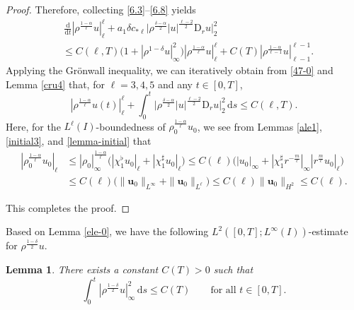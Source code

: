 \documentclass[11pt,reqno]{amsart}
\newtheorem{lem}{Lemma}[section]
\numberwithin{rk}{section}
\numberwithin{prop}{section}
\numberwithin{mydef}{section}
\numberwithin{lem}{section}
\numberwithin{equation}{section}
\numberwithin{thm}{section}
\begin{document}
\begin{proof}
Therefore, collecting \eqref{6.3}--\eqref{6.8} yields
\begin{equation*}
\begin{aligned}
&\,\frac{\mathrm{d}}{\mathrm{d}t}|\rho^\frac{1-\alpha}{\ell}u|_\ell^\ell+a_1\delta c_{*\ell}\big|\rho^\frac{\delta-\alpha}{2}|u|^\frac{\ell-2}{2}\mathrm{D}_r u\big|_2^2\\
&\leq C(\ell,T)\big(1+|\rho^{1-\delta}u|_\infty^2\big) |\rho^\frac{1-\alpha}{\ell}u|_\ell^\ell+C(T)|\rho^\frac{1-\alpha}{\ell-1}u|_{\ell-1}^{\ell-1}.
\end{aligned}
\end{equation*}
Applying the Gr\"onwall inequality, we can iteratively obtain from \eqref{47-0} and Lemma \ref{cru4} that, for $\ell=3,4,5$ and any $t\in [0,T]$,
\begin{equation*}
|\rho^\frac{1-\alpha}{\ell}u(t)|_\ell^\ell+ \int_0^t\big|\rho^\frac{\delta-\alpha}{2}|u|^\frac{\ell-2}{2}\mathrm{D}_r u\big|_2^2\,\mathrm{d}s\leq  C(\ell,T).
\end{equation*}
Here, for the $L^\ell(I)$-boundedness of $\rho_0^\frac{1-\alpha}{\ell}u_0$, we see from Lemmas \ref{ale1}, \ref{initial3}, and \ref{lemma-initial} that
\begin{equation*}
\begin{aligned}
|\rho_0^\frac{1-\alpha}{\ell}u_0|_\ell&\leq |\rho_0|_\infty^\frac{1-\alpha}{\ell}\big(|\chi_1^\flat u_0|_\ell+|\chi_1^\sharp u_0|_\ell\big)\leq C(\ell)\big(|u_0|_\infty+|\chi_1^\sharp r^{-\frac{m}{\ell}}|_\infty |r^\frac{m}{\ell}u_0|_\ell\big) \\
&\leq C(\ell)\big(\|\boldsymbol{u}_0\|_{L^\infty}+\|\boldsymbol{u}_0\|_{L^\ell}\big)\leq C(\ell)\|\boldsymbol{u}_0\|_{H^2}\leq C(\ell).
\end{aligned}
\end{equation*}

This completes the proof.
\end{proof}

Based on Lemma \ref{ele-0}, we have the following $L^2([0,T];L^\infty(I))$-estimate for $\rho^\frac{1-\delta}{2}u$.
\begin{lem}\label{cru5}
There exists a constant $C(T)>0$ such that
\begin{equation*}
\int_0^t |\rho^\frac{1-\delta}{2}u|_{\infty}^2\, \mathrm{d}s\leq C(T) \qquad\text{for all $t\in [0,T]$}.
\end{equation*}    
\end{lem}
\end{document}
